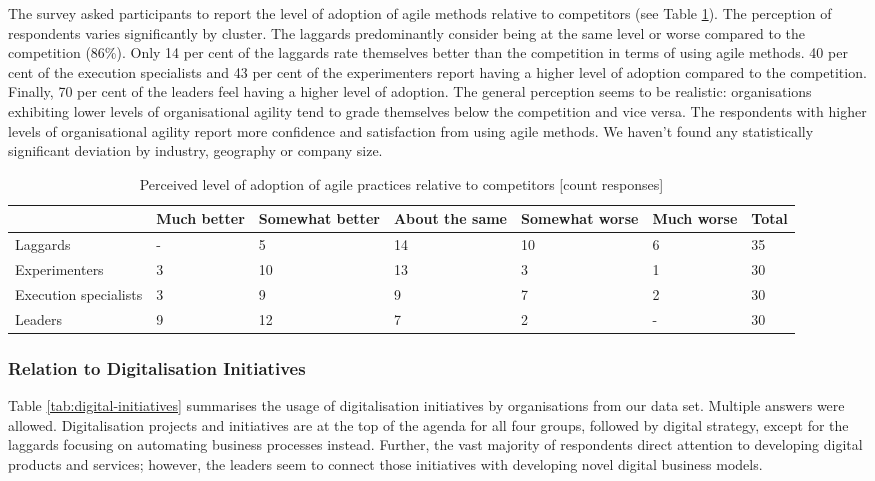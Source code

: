 \documentclass{article}
\begin{document}
The survey asked participants to report the level of adoption of agile methods relative to competitors (see Table \ref{tab:adoption-level-competitors}). The perception of respondents varies significantly by cluster. The laggards predominantly consider being at the same level or worse compared to the competition (86\%). Only 14 per cent of the laggards rate themselves better than the competition in terms of using agile methods. 40 per cent of the execution specialists and 43 per cent of the experimenters report having a higher level of adoption compared to the competition. Finally, 70 per cent of the leaders feel having a higher level of adoption. The general perception seems to be realistic: organisations exhibiting lower levels of organisational agility tend to grade themselves below the competition and vice versa. The respondents with higher levels of organisational agility report more confidence and satisfaction from using agile methods. We haven't found any statistically significant deviation by industry, geography or company size.
\begin{table}[hbt]
 \small
 \caption{Perceived level of adoption of agile practices relative to competitors [count responses]}
  \centering
  \begin{tabular}{lllllll}
     & Much better & Somewhat better & About the same & Somewhat worse & Much worse & Total \\
    \midrule
    Laggards & - & 5 & 14 & 10 & 6 & 35 \\
    Experimenters & 3 & 10 & 13 & 3 & 1 & 30 \\
    Execution specialists & 3 & 9 & 9 & 7 & 2 & 30 \\
    Leaders & 9 & 12 & 7 & 2 & - & 30 \\
     \midrule
  \end{tabular}
  \label{tab:adoption-level-competitors}
 \end{table}

\subsubsection{Relation to Digitalisation Initiatives}

Table \ref{tab:digital-initiatives} summarises the usage of digitalisation initiatives by organisations from our data set. Multiple answers were allowed. Digitalisation projects and initiatives are at the top of the agenda for all four groups, followed by digital strategy, except for the laggards focusing on automating business processes instead. Further, the vast majority of respondents direct attention to developing digital products and services; however, the leaders seem to connect those initiatives with developing novel digital business models.
\end{document}
